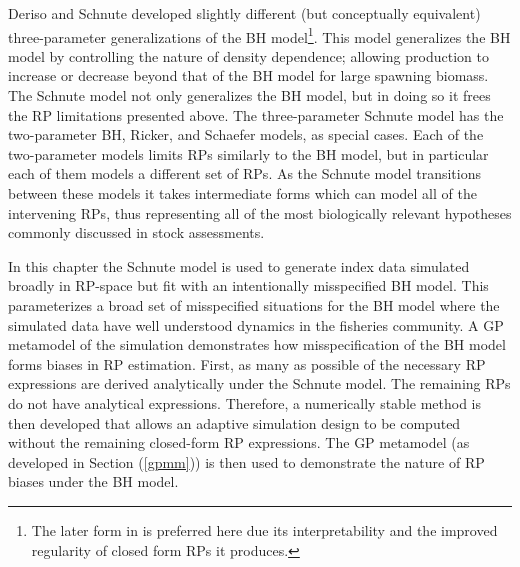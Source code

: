 %
Deriso \cite{deriso_harvesting_1980} and Schnute \cite{schnute_general_1985} 
developed slightly different (but conceptually equivalent) three-parameter 
generalizations of the BH model\footnote{
The later form in \cite{schnute_general_1985} is preferred here due its 
interpretability and the improved regularity of closed form RPs it produces.
}.
This model generalizes the BH model by controlling the nature of density 
dependence; allowing production to increase or decrease beyond that of the 
BH model for large spawning biomass. 
%
The Schnute model not only generalizes the BH model, but in doing so it 
frees the RP limitations presented above. The three-parameter Schnute model has 
the two-parameter BH, Ricker, and Schaefer models, as special cases. 
Each of the two-parameter models limits RPs similarly to the BH model, but in 
particular each of them models a different set of RPs. 
As the Schnute model transitions between these models it takes intermediate 
forms which can model all of the intervening RPs, thus representing all of 
the most biologically relevant hypotheses commonly discussed in stock assessments.  

%
In this chapter the Schnute model is used to generate index data simulated 
broadly in RP-space but fit with an intentionally misspecified BH model. This
parameterizes a broad set of misspecified situations for the BH model
where the simulated data have well understood dynamics in the fisheries
community. A GP metamodel of the simulation demonstrates how misspecification 
of the BH model forms biases in RP estimation. First, as many as possible of 
the necessary %
RP expressions are derived analytically under the Schnute model. The remaining 
RPs do not have analytical expressions. Therefore, a numerically stable method 
is then developed that allows an adaptive simulation design to be computed 
without the remaining closed-form RP expressions. The GP metamodel (as 
developed in Section (\ref{gpmm})) is then used to demonstrate the nature of RP 
biases under the BH model. 



